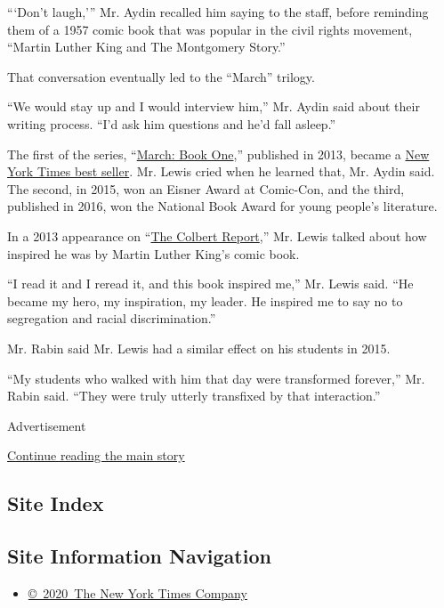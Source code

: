 ```Don't laugh,''' Mr. Aydin recalled him saying to the staff, before
reminding them of a 1957 comic book that was popular in the civil rights
movement, ``Martin Luther King and The Montgomery Story.''

That conversation eventually led to the ``March'' trilogy.

``We would stay up and I would interview him,'' Mr. Aydin said about
their writing process. ``I'd ask him questions and he'd fall asleep.''

The first of the series,
``\href{https://www.penguinrandomhouse.com/books/560278/march-book-one-oversized-edition-by-john-lewis/}{March:
Book One},'' published in 2013, became a
\href{https://www.nytimes.com/2016/11/27/books/review/john-lewis-march.html}{New
York Times best seller}. Mr. Lewis cried when he learned that, Mr. Aydin
said. The second, in 2015, won an Eisner Award at Comic-Con, and the
third, published in 2016, won the National Book Award for young people's
literature.

In a 2013 appearance on
``\href{http://www.cc.com/video-clips/ocqoae/the-colbert-report-john-lewis-pt--2}{The
Colbert Report},'' Mr. Lewis talked about how inspired he was by Martin
Luther King's comic book.

``I read it and I reread it, and this book inspired me,'' Mr. Lewis
said. ``He became my hero, my inspiration, my leader. He inspired me to
say no to segregation and racial discrimination.''

Mr. Rabin said Mr. Lewis had a similar effect on his students in 2015.

``My students who walked with him that day were transformed forever,''
Mr. Rabin said. ``They were truly utterly transfixed by that
interaction.''

Advertisement

\protect\hyperlink{after-bottom}{Continue reading the main story}

\hypertarget{site-index}{%
\subsection{Site Index}\label{site-index}}

\hypertarget{site-information-navigation}{%
\subsection{Site Information
Navigation}\label{site-information-navigation}}

\begin{itemize}
\tightlist
\item
  \href{https://help.nytimes.com/hc/en-us/articles/115014792127-Copyright-notice}{©~2020~The
  New York Times Company}
\end{itemize}

